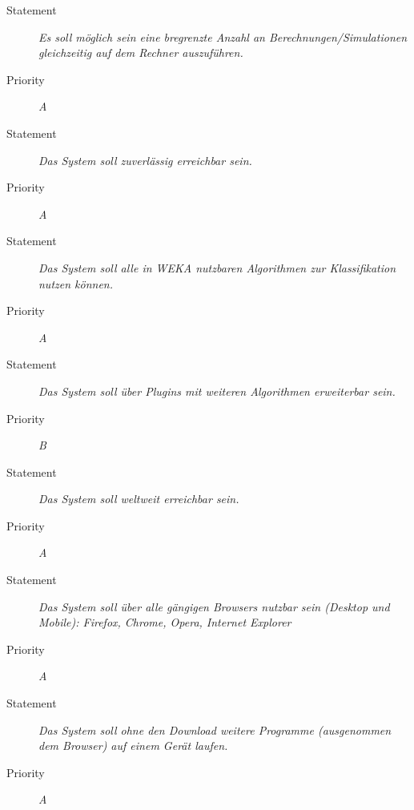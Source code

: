 \UR
\begin{description}
\item[Statement] \textit{Es soll möglich sein eine bregrenzte Anzahl an Berechnungen/Simulationen gleichzeitig auf dem Rechner auszuführen.} %
\item[Priority] \textit{A}
\end{description}

\UR
\begin{description}
\item[Statement] \textit{Das System soll zuverlässig erreichbar sein.}
\item[Priority] \textit{A}
\end{description}

\UR
\begin{description}
  \item[Statement]
    \textit{Das System soll alle in WEKA nutzbaren Algorithmen zur Klassifikation nutzen können.}
  \item[Priority]
    \textit{A}
\end{description}


\UR
\begin{description}
\item[Statement] \textit{Das System soll über \gls{Plugins} mit weiteren Algorithmen erweiterbar sein.}
\item[Priority] \textit{B}
\end{description}


\UR
\begin{description}
\item[Statement] \textit{Das System soll weltweit erreichbar sein.}
\item[Priority] \textit{A}
\end{description}


\UR
\begin{description}
  \item[Statement]
    \textit{Das System soll über alle gängigen \glspl{Browser} nutzbar sein (Desktop und Mobile): Firefox, Chrome, Opera, Internet Explorer} %
  \item[Priority]
    \textit{A}
\end{description}

\UR
\begin{description}
\item[Statement] \textit{Das System soll ohne den Download weitere Programme (ausgenommen dem Browser) auf einem Gerät laufen.}
\item[Priority] \textit{A}
\end{description}

